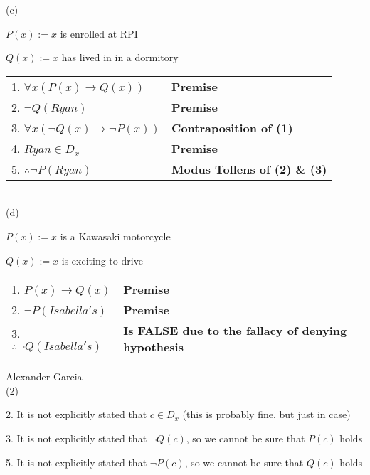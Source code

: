 \documentclass[]{article}
\def\imp{\rightarrow}
\begin{document}
(c)

$P(x) := x$ is enrolled at RPI

$Q(x) := x$ has lived in in a dormitory \\

\begin{tabular}{l l}

	1. $\forall x(P(x) \imp Q(x))$ & \textbf{Premise} \\

	2. $\neg Q(Ryan)$ & \textbf{Premise} \\

	3. $\forall x (\neg Q(x) \imp \neg P(x))$ & \textbf{Contraposition of (1)} \\

	4. $Ryan \in D_x$ & \textbf{Premise} \\

	5. $\therefore \neg P(Ryan)$ & \textbf{Modus Tollens of (2) \& (3)} \\

\end{tabular} \\

(d) 

$P(x) := x$ is a Kawasaki motorcycle

$Q(x) := x$ is exciting to drive

\begin{tabular}{l l}

	1. $P(x) \imp Q(x)$ & \textbf{Premise} \\

	2. $\neg P(Isabella's)$ & \textbf{Premise} \\

	3. $\therefore \neg Q(Isabella's)$ &\textbf{Is FALSE due to the fallacy of denying hypothesis} \\

\end{tabular}

\newpage

Alexander Garcia \\

\noindent (2) 

2. It is not explicitly stated that $c \in D_x$ (this is probably fine, but just in case)

3. It is not explicitly stated that $\neg Q(c)$, so we cannot be sure that $P(c)$ holds

5. It is not explicitly stated that $\neg P(c)$, so we cannot be sure that $Q(c)$ holds

\newpage
\end{document}
